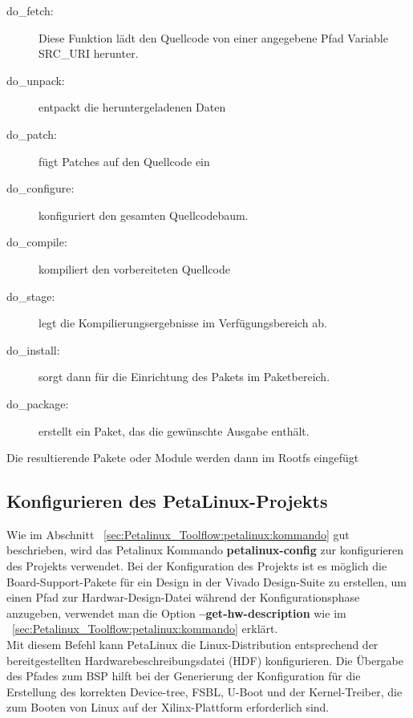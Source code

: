 \begin{description}
	\item[do_fetch:] Diese Funktion lädt den Quellcode von einer angegebene Pfad Variable SRC_URI herunter. 
	\item[do_unpack:] entpackt die heruntergeladenen Daten
	\item[do_patch:] fügt Patches auf den Quellcode ein
	\item[do_configure:] konfiguriert den gesamten Quellcodebaum.
	\item[do_compile:] kompiliert den vorbereiteten Quellcode
	\item[do_stage:] legt die Kompilierungsergebnisse im Verfügungsbereich ab.
	\item[do_install:] sorgt dann für die Einrichtung des Pakets im Paketbereich.
	\item[do_package:] erstellt ein Paket, das die gewünschte Ausgabe enthält.
\end{description} 

Die resultierende Pakete oder Module werden dann im Rootfs eingefügt
\subsection{Konfigurieren des PetaLinux-Projekts}
Wie im Abschnitt  ~\ref{sec:Petalinux_Toolflow:petalinux:kommando} gut beschrieben, wird das Petalinux Kommando \textbf{petalinux-config} zur konfigurieren des Projekts verwendet. Bei der Konfiguration des Projekts ist es möglich die Board-Support-Pakete für ein Design in der Vivado Design-Suite zu erstellen, um einen Pfad zur Hardwar-Design-Datei während der Konfigurationsphase anzugeben, verwendet man die Option \textbf{--get-hw-description} wie im ~\ref{sec:Petalinux_Toolflow:petalinux:kommando} erklärt. \\
Mit diesem Befehl kann PetaLinux die Linux-Distribution entsprechend der bereitgestellten Hardwarebeschreibungsdatei (HDF) konfigurieren. Die Übergabe des Pfades zum BSP hilft bei der Generierung der Konfiguration für die Erstellung des korrekten Device-tree, FSBL, U-Boot und der Kernel-Treiber, die zum Booten von Linux auf der Xilinx-Plattform erforderlich sind.

